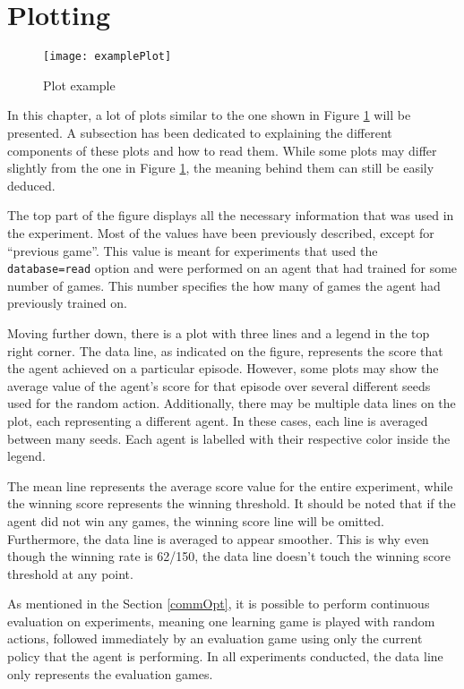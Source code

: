 \section{Plotting}

\begin{figure}[h]
    \centering
    \texttt{[image: examplePlot]}
    \caption{Plot example}
    \label{fig:plt_eg}
\end{figure}

In this chapter, a lot of plots similar to the one shown in Figure \ref{fig:plt_eg} will be presented. A subsection has been dedicated to explaining the different components of these plots and how to read them. While some plots may differ slightly from the one in Figure \ref{fig:plt_eg}, the meaning behind them can still be easily deduced.

The top part of the figure displays all the necessary information that was used in the experiment. Most of the values have been previously described, except for ``previous game''. This value is meant for experiments that used the \texttt{database=read} option and were performed on an agent that had trained for some number of games. This number specifies the how many of games the agent had previously trained on.

Moving further down, there is a plot with three lines and a legend in the top right corner. The data line, as indicated on the figure, represents the score that the agent achieved on a particular episode. However, some plots may show the average value of the agent's score for that episode over several different seeds used for the random action. Additionally, there may be multiple data lines on the plot, each representing a different agent. In these cases, each line is averaged between many seeds. Each agent is labelled with their respective color inside the legend.

The mean line represents the average score value for the entire experiment, while the winning score represents the winning threshold. It should be noted that if the agent did not win any games, the winning score line will be omitted. Furthermore, the data line is averaged to appear smoother. This is why even though the winning rate is 62/150, the data line doesn't touch the winning score threshold at any point.

As mentioned in the Section \ref{commOpt}, it is possible to perform continuous evaluation on experiments, meaning one learning game is played with random actions, followed immediately by an evaluation game using only the current policy that the agent is performing. In all experiments conducted, the data line only represents the evaluation games.

